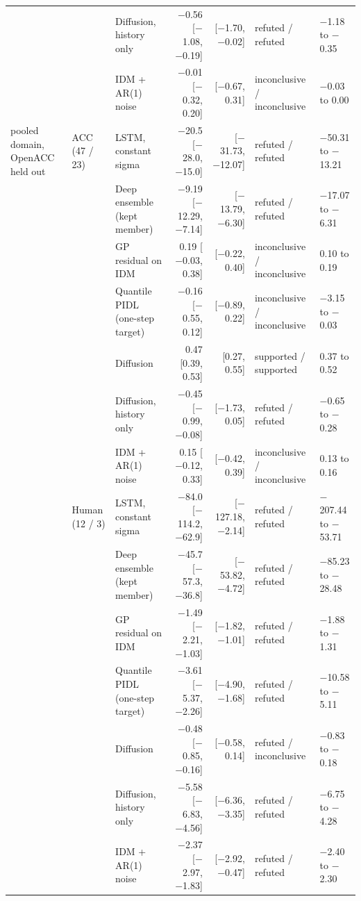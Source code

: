 \begin{longtable}{lllrrll}
 &  & Diffusion, history only & $-$0.56 [$-$1.08, $-$0.19] & [$-$1.70, $-$0.02] & refuted / refuted & $-$1.18 to $-$0.35 \\
 &  & IDM + AR(1) noise & $-$0.01 [$-$0.32, 0.20] & [$-$0.67, 0.31] & inconclusive / inconclusive & $-$0.03 to 0.00 \\
\midrule
pooled domain, OpenACC held out & ACC (47 / 23) & LSTM, constant sigma & $-$20.5 [$-$28.0, $-$15.0] & [$-$31.73, $-$12.07] & refuted / refuted & $-$50.31 to $-$13.21 \\
 &  & Deep ensemble (kept member) & $-$9.19 [$-$12.29, $-$7.14] & [$-$13.79, $-$6.30] & refuted / refuted & $-$17.07 to $-$6.31 \\
 &  & GP residual on IDM & 0.19 [$-$0.03, 0.38] & [$-$0.22, 0.40] & inconclusive / inconclusive & 0.10 to 0.19 \\
 &  & Quantile PIDL (one-step target) & $-$0.16 [$-$0.55, 0.12] & [$-$0.89, 0.22] & inconclusive / inconclusive & $-$3.15 to $-$0.03 \\
 &  & Diffusion & 0.47 [0.39, 0.53] & [0.27, 0.55] & supported / supported & 0.37 to 0.52 \\
 &  & Diffusion, history only & $-$0.45 [$-$0.99, $-$0.08] & [$-$1.73, 0.05] & refuted / refuted & $-$0.65 to $-$0.28 \\
 &  & IDM + AR(1) noise & 0.15 [$-$0.12, 0.33] & [$-$0.42, 0.39] & inconclusive / inconclusive & 0.13 to 0.16 \\
\midrule
 & Human (12 / 3) & LSTM, constant sigma & $-$84.0 [$-$114.2, $-$62.9] & [$-$127.18, $-$2.14] & refuted / refuted & $-$207.44 to $-$53.71 \\
 &  & Deep ensemble (kept member) & $-$45.7 [$-$57.3, $-$36.8] & [$-$53.82, $-$4.72] & refuted / refuted & $-$85.23 to $-$28.48 \\
 &  & GP residual on IDM & $-$1.49 [$-$2.21, $-$1.03] & [$-$1.82, $-$1.01] & refuted / refuted & $-$1.88 to $-$1.31 \\
 &  & Quantile PIDL (one-step target) & $-$3.61 [$-$5.37, $-$2.26] & [$-$4.90, $-$1.68] & refuted / refuted & $-$10.58 to $-$5.11 \\
 &  & Diffusion & $-$0.48 [$-$0.85, $-$0.16] & [$-$0.58, 0.14] & refuted / inconclusive & $-$0.83 to $-$0.18 \\
 &  & Diffusion, history only & $-$5.58 [$-$6.83, $-$4.56] & [$-$6.36, $-$3.35] & refuted / refuted & $-$6.75 to $-$4.28 \\
 &  & IDM + AR(1) noise & $-$2.37 [$-$2.97, $-$1.83] & [$-$2.92, $-$0.47] & refuted / refuted & $-$2.40 to $-$2.30 \\

\end{longtable}
